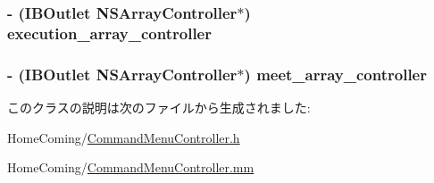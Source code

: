 \hypertarget{interface_command_menu_controller_ab2cd2691114ed258bbb87d9febf1ccf2}{
\subsubsection[{execution\-\_\-array\-\_\-controller}]{\setlength{\rightskip}{0pt plus 5cm}-\/ (I\-B\-Outlet N\-S\-Array\-Controller$\ast$) {\bf execution\-\_\-array\-\_\-controller}}}\label{interface_command_menu_controller_ab2cd2691114ed258bbb87d9febf1ccf2}
\hypertarget{interface_command_menu_controller_a8a78852fe06f58855cc22b7bd5a3a5b3}{
\subsubsection[{meet\-\_\-array\-\_\-controller}]{\setlength{\rightskip}{0pt plus 5cm}-\/ (I\-B\-Outlet N\-S\-Array\-Controller$\ast$) {\bf meet\-\_\-array\-\_\-controller}}}\label{interface_command_menu_controller_a8a78852fe06f58855cc22b7bd5a3a5b3}


このクラスの説明は次のファイルから生成されました\-:\begin{DoxyCompactItemize}
\item 
Home\-Coming/\hyperlink{_command_menu_controller_8h}{Command\-Menu\-Controller.\-h}\item 
Home\-Coming/\hyperlink{_command_menu_controller_8mm}{Command\-Menu\-Controller.\-mm}\end{DoxyCompactItemize}
